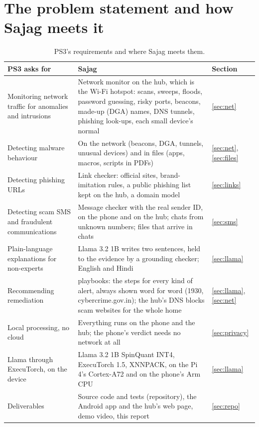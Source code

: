 \documentclass[11pt,a4paper]{article}
\begin{document}
\section{The problem statement and how Sajag meets it}

\begin{table}[H]
\centering\small
\begin{tabularx}{\textwidth}{@{}>{\raggedright\arraybackslash}p{4.3cm}>{\raggedright\arraybackslash}X>{\raggedright\arraybackslash}p{1.6cm}@{}}
\toprule
\textbf{PS3 asks for} & \textbf{Sajag} & \textbf{Section}\\
\midrule
Monitoring network traffic for anomalies and intrusions & Network monitor on the hub, which is the Wi-Fi hotspot: scans, sweeps, floods, password guessing, risky ports, beacons, made-up (DGA) names, DNS tunnels, phishing look-ups, each small device's normal & \ref{sec:net}\\
Detecting malware behaviour & On the network (beacons, DGA, tunnels, unusual devices) and in files (apps, macros, scripts in PDFs) & \ref{sec:net}, \ref{sec:files}\\
Detecting phishing URLs & Link checker: official sites, brand-imitation rules, a public phishing list kept on the hub, a domain model & \ref{sec:links}\\
Detecting scam SMS and fraudulent communications & Message checker with the real sender ID, on the phone and on the hub; chats from unknown numbers; files that arrive in chats & \ref{sec:sms}\\
Plain-language explanations for non-experts & Llama 3.2 1B writes two sentences, held to the evidence by a grounding checker; English and Hindi & \ref{sec:llama}\\
Recommending remediation & 25 playbooks: the steps for every kind of alert, always shown word for word (1930, cybercrime.gov.in); the hub's DNS blocks scam websites for the whole home & \ref{sec:llama}, \ref{sec:net}\\
Local processing, no cloud & Everything runs on the phone and the hub; the phone's verdict needs no network at all & \ref{sec:privacy}\\
Llama through ExecuTorch, on the device & Llama 3.2 1B SpinQuant INT4, ExecuTorch 1.5, XNNPACK, on the Pi 4's Cortex-A72 and on the phone's Arm CPU & \ref{sec:llama}\\
Deliverables & Source code and tests (repository), the Android app and the hub's web page, demo video, this report & \ref{sec:repo}\\
\bottomrule
\end{tabularx}
\caption{PS3's requirements and where Sajag meets them.}
\end{table}
\end{document}
